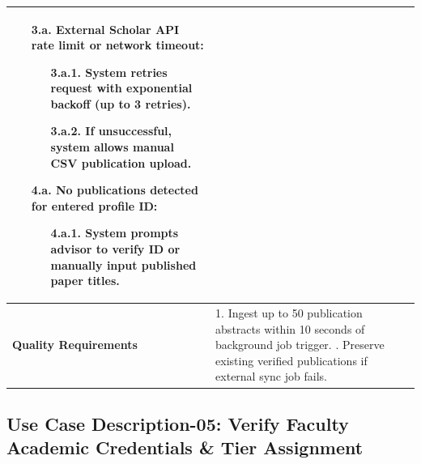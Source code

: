 \begin{table}[H]
\begin{tabularx}{\textwidth}{|l|X|}
\begin{itemize}[leftmargin=*]
    \item[\textbf{3.a.}] \textbf{External Scholar API rate limit or network timeout:}
    \begin{itemize}[leftmargin=*]
        \item[3.a.1.] System retries request with exponential backoff (up to 3 retries).
        \item[3.a.2.] If unsuccessful, system allows manual CSV publication upload.
    \end{itemize}
    \item[\textbf{4.a.}] \textbf{No publications detected for entered profile ID:}
    \begin{itemize}[leftmargin=*]
        \item[4.a.1.] System prompts advisor to verify ID or manually input published paper titles.
    \end{itemize}
\end{itemize} \\ \hline
\textbf{Quality Requirements} & 
1. Ingest up to 50 publication abstracts within 10 seconds of background job trigger. \newline
2. Preserve existing verified publications if external sync job fails. \\ \hline
\end{tabularx}
\end{table}

\clearpage
\subsection{Use Case Description-05: Verify Faculty Academic Credentials \& Tier Assignment}
\label{subsec:uc05}

